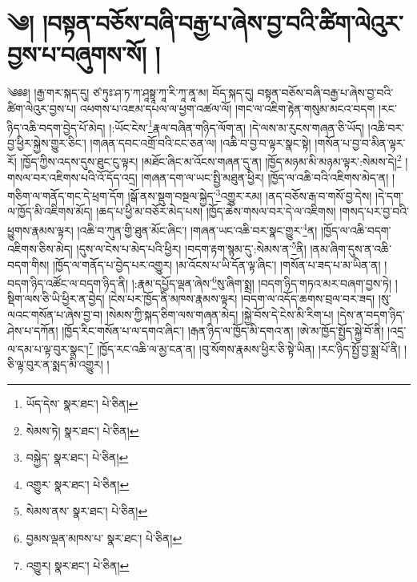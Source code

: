 \setcounter{footnote}{0} 
\chapter{༄། །བསྟན་བཅོས་བཞི་བརྒྱ་པ་ཞེས་བྱ་བའི་ཚིག་ལེའུར་བྱས་པ་བཞུགས་སོ། །}༄༅༅། །རྒྱ་གར་སྐད་དུ། ཙ་ཏུཿ་ཤ་ཏ་ཀ་ཤཱསྟྲཱ་ཀཱ་རི་ཀཱ་ནཱ་མ། བོད་སྐད་དུ། བསྟན་བཅོས་བཞི་བརྒྱ་པ་ཞེས་བྱ་བའི་ཚིག་ལེའུར་བྱས་པ། འཕགས་པ་འཇམ་དཔལ་ལ་ཕྱག་འཚལ་ལོ། །གང་ལ་འཇིག་རྟེན་གསུམ་མངའ་བདག །རང་ཉིད་འཆི་བདག་བྱེད་པོ་མེད། །:ཡོང་ངེས་\footnote{ཡོད་དེས་  སྣར་ཐང་།  པེ་ཅིན། }རྣལ་བཞིན་གཉིད་ལོག་ན། །དེ་ལས་མ་རུངས་གཞན་ཅི་ཡོད། །འཆི་བར་བྱ་ཕྱིར་སྐྱེས་གྱུར་ཅིང་། །གཞན་དབང་འགྲོ་བའི་ངང་ཅན་ལ། །འཆི་བ་བྱ་བ་ལྟར་སྣང་སྟེ། །གསོན་པ་བྱ་བ་མིན་ལྟར་རོ། །ཁྱོད་ཀྱིས་འདས་དུས་ཐུང་ངུ་ལྟར། །མཐོང་ཞིང་མ་འོངས་གཞན་དུ་ན། །ཁྱོད་མཉམ་མི་མཉམ་ལྟར་:སེམས་དེ།\footnote{སེམས་ཏེ།  སྣར་ཐང་།  པེ་ཅིན། } །གསལ་བར་འཇིགས་པའི་འོ་དོད་འདྲ། །གཞན་དག་ལ་ཡང་སྤྱི་མཐུན་ཕྱིར། །ཁྱོད་ལ་འཆི་བའི་འཇིགས་མེད་ན། །གཅིག་ལ་གནོད་གང་དེ་ཕྲག་དོག །སྒོ་ནས་སྡུག་བསྔལ་སྐྱེད་\footnote{བསྐྱེད་  སྣར་ཐང་།  པེ་ཅིན། }འགྱུར་རམ། །ནད་བཅོས་རྒ་བ་གསོ་བྱ་དེས། །དེ་དག་ལ་ཁྱོད་མི་འཇིགས་མོད། །ཆད་པ་ཕྱི་མ་བཅོར་མེད་པས། །ཁྱོད་ཆེས་གསལ་བར་དེ་ལ་འཇིགས། །གསད་པར་བྱ་བའི་ཕྱུགས་རྣམས་ལྟར། །འཆི་བ་ཀུན་གྱི་ཐུན་མོང་ཞིང་། །གཞན་ཡང་འཆི་བར་སྣང་གྱུར་\footnote{འགྱུར་  སྣར་ཐང་།  པེ་ཅིན། }ན། །ཁྱོད་ལ་འཆི་བདག་འཇིགས་ཅིས་མེད། །དུས་ལ་ངེས་པ་མེད་པའི་ཕྱིར། །བདག་རྟག་སྙམ་དུ་:སེམས་ན་\footnote{སེམས་ནས་  སྣར་ཐང་།  པེ་ཅིན། }ནི། །ནམ་ཞིག་དུས་ན་འཆི་བདག་གིས། །ཁྱོད་ལ་གནོད་པ་བྱེད་པར་འགྱུར། །མ་འོངས་པ་ཡི་དོན་ལྟ་ཞིང་། །གསོན་པ་ཟད་པ་མ་ཡིན་ན། །བདག་ཉིད་འཚོང་ལ་བདག་ཉིད་ནི། །:རྣམ་དཔྱོད་ལྡན་ཞེས་\footnote{བྱམས་ལྡན་མཁས་པ་  སྣར་ཐང་།  པེ་ཅིན། }སུ་ཞིག་སྨྲ། །བདག་ཉིད་གཏའ་མར་བཞག་བྱས་ཏེ། །སྡིག་ལས་ཅི་ཡི་ཕྱིར་ན་བྱེད། །ངེས་པར་ཁྱོད་ནི་མཁས་རྣམས་ལྟར། །བདག་ལ་འདོད་ཆགས་བྲལ་བར་ཟད། །སུ་ལའང་གསོན་པ་ཞེས་བྱ་བ། །སེམས་ཀྱི་སྐད་ཅིག་ལས་གཞན་མེད། །སྐྱེ་བོས་དེ་ངེས་མི་རིག་པ། །དེས་ན་བདག་ཉིད་ཤེས་པ་དཀོན། །ཁྱོད་རིང་གསོན་པ་ལ་དགའ་ཞིང་། །རྒན་ཉིད་ལ་ཁྱོད་མི་དགའ་ན། །ཨེ་མ་ཁྱོད་སྤྱོད་སྐྱེ་བོ་ནི། །འདྲ་ལ་དམ་པ་ལྟ་བུར་སྣང་།\footnote{འགྱུར།  སྣར་ཐང་།  པེ་ཅིན། } །ཁྱོད་རང་འཆི་ལ་མྱ་ངན་ན། །བུ་སོགས་རྣམས་ཕྱིར་ཅི་སྟེ་ཡིན། །རང་ཉིད་སྤྱོ་བྱ་སྨྲ་པོ་ནི། །ཅི་ལྟ་བུར་ན་སྨད་མི་འགྱུར། །
